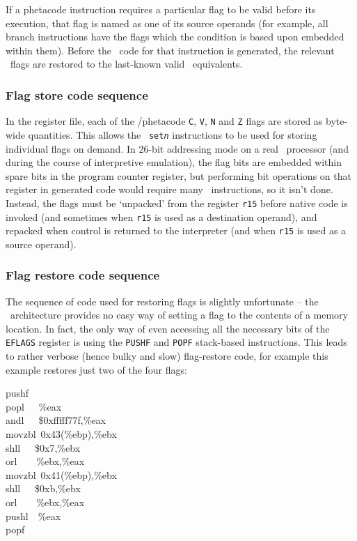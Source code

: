 If a phetacode instruction requires a particular flag to be valid before its execution, that flag is named as one of its source operands (for example, all branch instructions have the flags which the condition is based upon embedded within them). Before the \ia\ code for that instruction is generated, the relevant \ia\ flags are restored to the last-known valid \arm\ equivalents.

\subsubsection{Flag store code sequence}

In the register file, each of the \arm/phetacode {\tt C}, {\tt V}, {\tt N} and {\tt Z} flags are stored as byte-wide quantities. This allows the \ia\ {\tt set{\it n}} instructions to be used for storing individual flags on demand. In 26-bit addressing mode on a real \arm\ processor (and during the course of interpretive emulation), the flag bits are embedded within spare bits in the program counter register, but performing bit operations on that register in generated code would require many \ia\ instructions, so it isn't done. Instead, the flags must be `unpacked' from the register {\tt r15} before native code is invoked (and sometimes when {\tt r15} is used as a destination operand), and repacked when control is returned to the interpreter (and when {\tt r15} is used as a source operand).

\subsubsection{Flag restore code sequence}

The sequence of code used for restoring flags is slightly unfortunate -- the \ia\ architecture provides no easy way of setting a flag to the contents of a memory location. In fact, the only way of even accessing all the necessary bits of the {\tt EFLAGS} register is using the {\tt PUSHF} and {\tt POPF} stack-based instructions. This leads to rather verbose (hence bulky and slow) flag-restore code, for example this example restores just two of the four flags:

\begin{code}
pushf\\
popl~~~\%eax\\
andl~~~\$0xfffff77f,\%eax\\
movzbl~0x43(\%ebp),\%ebx\\
shll~~~\$0x7,\%ebx\\
orl~~~~\%ebx,\%eax\\
movzbl~0x41(\%ebp),\%ebx\\
shll~~~\$0xb,\%ebx\\
orl~~~~\%ebx,\%eax\\
pushl~~\%eax\\
popf
\end{code}

